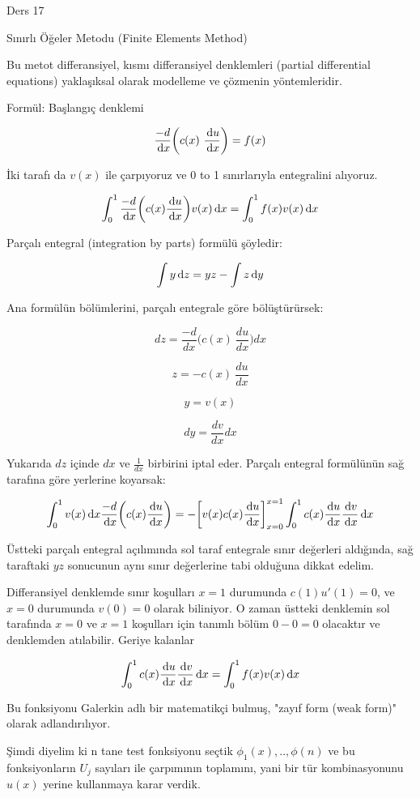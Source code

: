 \documentclass[12pt,fleqn]{article}\usepackage{../../common}
\begin{document}
Ders 17

Sınırlı Öğeler Metodu (Finite Elements Method)

Bu metot differansiyel, kısmı differansiyel denklemleri (partial
differential equations) yaklaşıksal olarak modelleme ve çözmenin
yöntemleridir.

Formül: Başlangıç denklemi

$$ \frac{-d}{\,\mathrm{d} x} \bigg( c(x) \ \frac{\,\mathrm{d} u}{\,\mathrm{d} x} \bigg) = f(x) $$

İki tarafı da  $v(x)$ ile çarpıyoruz ve 0 to 1 sınırlarıyla entegralini alıyoruz.

$$
\int_0^1 \frac{-d}{\,\mathrm{d} x} \bigg( c(x) \frac{\,\mathrm{d} u}{\,\mathrm{d} x} \bigg) v(x)\,\mathrm{d} x
= \int_0^1 f(x)v(x) \,\mathrm{d} x
$$

Parçalı entegral (integration by parts) formülü şöyledir:

$$ \int y \,\mathrm{d} z = y  z - \int z \,\mathrm{d} y $$

Ana formülün bölümlerini, parçalı entegrale göre bölüştürürsek:

$$ dz = \frac{-d}{dx} \bigg( c(x) \ \frac{du}{dx} \bigg) dx  $$

$$ z = - c(x) \ \frac{du}{dx}  $$

$$ y = v(x)  $$

$$ dy = \frac{dv}{dx}dx $$

Yukarıda $dz$ içinde $dx$ ve $\frac{1}{dx}$ birbirini iptal eder. Parçalı
entegral formülünün sağ tarafına göre yerlerine koyarsak:

$$
\int_0^1 v(x)\,\mathrm{d} x \frac{-d}{\,\mathrm{d} x} \bigg( c(x) \frac{\,\mathrm{d} u}{\,\mathrm{d} x} \bigg)
= - \bigg[ v(x) c(x) \frac{\,\mathrm{d} u}{\,\mathrm{d} x} \bigg]_{x=0}^{x=1} \int_0^1 c(x) \frac{\,\mathrm{d} u}{\,\mathrm{d} x} \frac{\,\mathrm{d} v}{\,\mathrm{d} x} \,\mathrm{d} x
$$

Üstteki parçalı entegral açılımında sol taraf entegrale sınır
değerleri aldığında, sağ taraftaki $yz$ sonucunun aynı sınır
değerlerine tabi olduğuna dikkat edelim.

Differansiyel denklemde sınır koşulları $x=1$ durumunda $c(1)u'(1)=0$,
ve $x=0$ durumunda $v(0)=0$ olarak biliniyor. O zaman üstteki
denklemin sol tarafında $x=0$ ve $x=1$ koşulları için tanımlı bölüm $0
- 0 = 0$ olacaktır ve denklemden atılabilir. Geriye kalanlar

$$
\int_0^1 c(x) \frac{\,\mathrm{d} u}{\,\mathrm{d} x} \frac{\,\mathrm{d} v}{\,\mathrm{d} x} \,\mathrm{d} x
= \int_0^1 f(x)v(x) \,\mathrm{d} x
$$

Bu fonksiyonu Galerkin adlı bir matematikçi bulmuş, "zayıf form (weak
form)" olarak adlandırılıyor.

Şimdi diyelim ki n tane test fonksiyonu seçtik $\phi_1(x),..,\phi(n)$
ve bu fonksiyonların $U_j$ sayıları ile çarpımının toplamını, yani bir
tür kombinasyonunu $u(x)$ yerine kullanmaya karar verdik.
\end{document}
